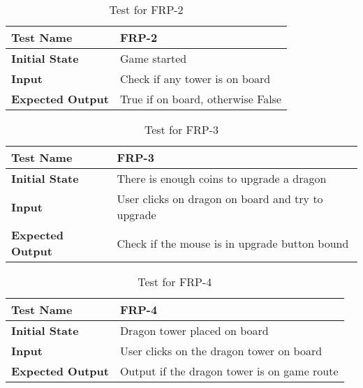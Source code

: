 \documentclass[12,english]{article}
\begin{document}
        \begin{table}[h!]
        	\begin{tabular}[r]{|l|l|}
        	    \hline
        		\textbf{Test Name} & FRP-2\\ 
        		\hline
        		\textbf{Initial State} & Game started\\ 
        		\hline
        		\textbf{Input} & Check if any tower is on board\\ 
        		\hline 
        		\textbf{Expected Output} & True if on board, otherwise False\\ 
        		\hline
        	\end{tabular}
        	\caption{Test for FRP-2}
        	\label{Table}
        \end{table}
        
        \begin{table}[h!]
        	\begin{tabular}[r]{|l|l|}
        	    \hline
        		\textbf{Test Name} & FRP-3\\ 
        		\hline
        		\textbf{Initial State} & There is enough coins to upgrade a dragon\\ 
        		\hline
        		\textbf{Input} & User clicks on dragon on board and try to upgrade\\ 
        		\hline 
        		\textbf{Expected Output} & Check if the mouse is in upgrade button bound\\ 
        		\hline
        	\end{tabular}
        	\caption{Test for FRP-3}
        	\label{Table}
        \end{table}
        
        \begin{table}[h!]
        	\begin{tabular}[r]{|l|l|}
        	    \hline
        		\textbf{Test Name} & FRP-4\\ 
        		\hline
        		\textbf{Initial State} & Dragon tower placed on board\\ 
        		\hline
        		\textbf{Input} & User clicks on the dragon tower on board\\ 
        		\hline 
        		\textbf{Expected Output} & Output if the dragon tower is on game route\\ 
        		\hline
        	\end{tabular}
        	\caption{Test for FRP-4}
        	\label{Table}
        \end{table}
\end{document}
